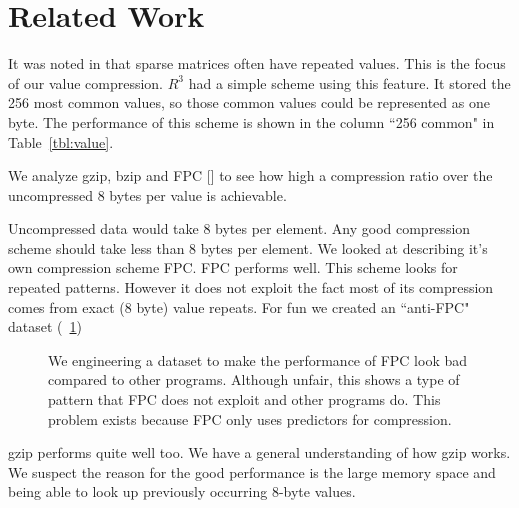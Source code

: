 \section{Related Work}
\label{sec:fziprelated}
It was noted in \cite{prelim:kourtis, prelim:grigoras} that sparse matrices often have repeated values. This is the focus of our value compression. $R^3$ had a simple scheme using this feature. It stored the 256 most common values, so those common values could be represented as one byte. The performance of this scheme is shown in the column ``256 common" in Table~\ref{tbl:value}.\par
We analyze gzip, bzip and FPC [\cite{prelim:burtscher}] to see how high a compression ratio over the uncompressed 8 bytes per value is achievable.\par
Uncompressed data would take 8 bytes per element. Any good compression scheme should take less than 8 bytes per element. We looked at \cite{prelim:burtscher} describing it's own compression scheme FPC. FPC performs well. This scheme looks for repeated patterns. However it does not exploit the fact most of its compression comes from exact (8 byte) value repeats. For fun we created an ``anti-FPC" dataset (\figurename~\ref{fig:antiFpc})\\
\begin{figure}
    \center
{}
\caption[Anti-FPC]{We engineering a dataset to make the performance of FPC look bad compared to other programs. Although unfair, this shows a type of pattern that FPC does not exploit and other programs do. This problem exists because FPC only uses predictors for compression.}
\label{fig:antiFpc}
\end{figure}
\indent gzip performs quite well too. We have a general understanding of how gzip works. We suspect the reason for the good performance is the large memory space and being able to look up previously occurring 8-byte values.\par
